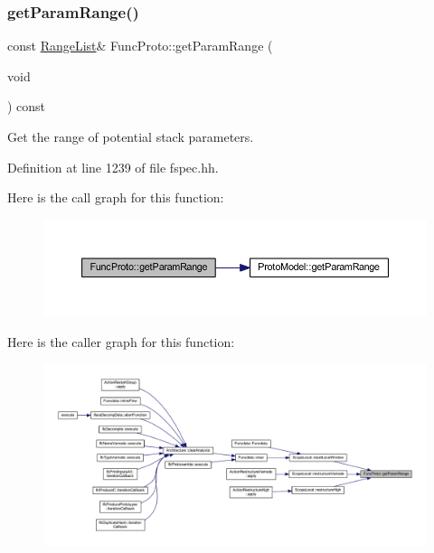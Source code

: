 \subsubsection{\texorpdfstring{getParamRange()}{getParamRange()}}
{\footnotesize\ttfamily const \mbox{\hyperlink{class_range_list}{Range\+List}}\& Func\+Proto\+::get\+Param\+Range (\begin{DoxyParamCaption}\item[{void}]{ }\end{DoxyParamCaption}) const\hspace{0.3cm}{\ttfamily [inline]}}



Get the range of potential stack parameters. 



Definition at line 1239 of file fspec.\+hh.

Here is the call graph for this function\+:
\nopagebreak
\begin{figure}[H]
\begin{center}
\leavevmode
\includegraphics[width=350pt]{class_func_proto_a147ea3f4d50df93a0ff16f17ea204ac9_cgraph}
\end{center}
\end{figure}
Here is the caller graph for this function\+:
\nopagebreak
\begin{figure}[H]
\begin{center}
\leavevmode
\includegraphics[width=350pt]{class_func_proto_a147ea3f4d50df93a0ff16f17ea204ac9_icgraph}
\end{center}
\end{figure}
\mbox{\label{class_func_proto_a1b220dc769358d73110df5c60744566b}} 

